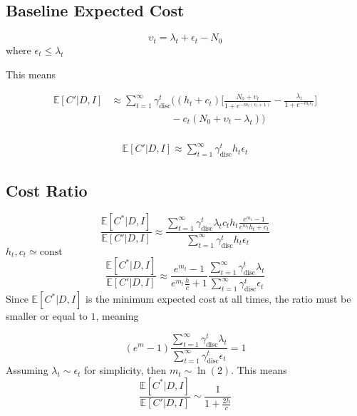 \subsection{Baseline Expected Cost}

\begin{equation}
	\upsilon_t= \lambda_t+\epsilon_t-N_0
\end{equation}
where $\epsilon_t\leq \lambda_t$

This means

\begin{equation}
	\begin{split}
		\mathbb{E}[C'|D,I] &\approx \sum_{t=1}^{\infty} \gamma_{\text{disc}}^{t} \bigg( 
		(h_t+c_t)\bigg[\frac{N_0 + \upsilon_t}{1+e^{-m_t(\epsilon_t+1)}}- \frac{\lambda_t}{1+e^{-m_t\epsilon_t}}\bigg]\\
		&\qquad\qquad\qquad
		- c_t(N_0 + \upsilon_t-\lambda_t)\bigg)\\
	\end{split}
\end{equation}

\begin{equation}
	\begin{split}
		\mathbb{E}[C'|D,I] \approx \sum_{t=1}^{\infty} \gamma_{\text{disc}}^{t} h_t\epsilon_t
	\end{split}
\end{equation}


\subsection{Cost Ratio}

\begin{equation}
	\frac{\mathbb{E}[C^*|D,I] }{\mathbb{E}[C'|D,I]}\approx \frac{\sum_{t=1}^{\infty} \gamma_{\text{disc}}^{t} \lambda_tc_th_t\frac{e^{m_t}-1}{e^{m_t}h_t+c_t}}{\sum_{t=1}^{\infty} \gamma_{\text{disc}}^{t} h_t\epsilon_t}
\end{equation}
$h_t,c_t\simeq \text{const}$
\begin{equation}
		\frac{\mathbb{E}[C^*|D,I] }{\mathbb{E}[C'|D,I]}\approx \frac{e^{m_t}-1}{e^{m_t}\frac{h}{c}+1}\frac{\sum_{t=1}^{\infty} \gamma_{\text{disc}}^{t} \lambda_t}{\sum_{t=1}^{\infty} \gamma_{\text{disc}}^{t} \epsilon_t}
\end{equation}
Since $\mathbb{E}[C^*|D,I]$ is the minimum expected cost at all times, the ratio must be smaller or equal to $1$, meaning

\begin{equation}
	(e^{m}-1)\frac{\sum_{t=1}^{\infty} \gamma_{\text{disc}}^{t} \lambda_t}{\sum_{t=1}^{\infty} \gamma_{\text{disc}}^{t} \epsilon_t}=1
\end{equation}
Assuming $\lambda_t\sim \epsilon_t$ for simplicity, then $m_t\sim \ln(2)$. This means
\begin{equation}
	\frac{\mathbb{E}[C^*|D,I] }{\mathbb{E}[C'|D,I]}\sim \frac{1}{1+\frac{2h}{c}}
\end{equation}

